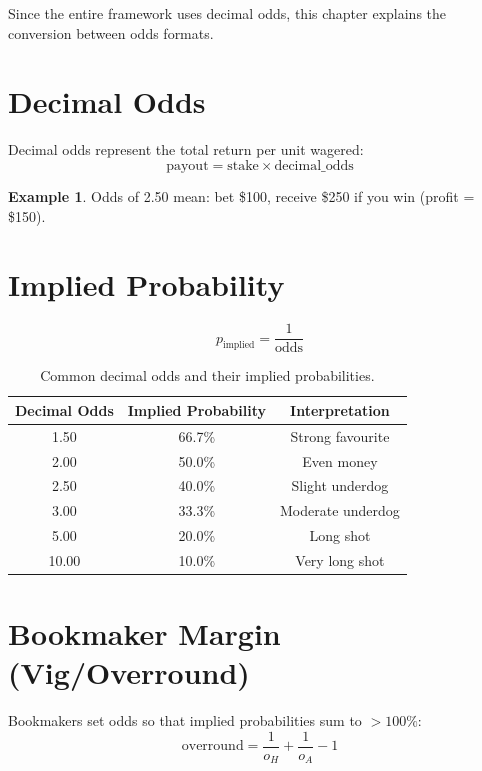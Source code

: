 \documentclass[12pt,a4paper]{report}
\theoremstyle{definition}
\newtheorem{example}{Example}[chapter]
\begin{document}
Since the entire framework uses decimal odds, this chapter explains the conversion between odds formats.

\section{Decimal Odds}

Decimal odds represent the total return per unit wagered:
\begin{equation}
    \text{payout} = \text{stake} \times \text{decimal\_odds}
\end{equation}

\begin{example}
Odds of 2.50 mean: bet \$100, receive \$250 if you win (profit = \$150).
\end{example}

\section{Implied Probability}

\begin{equation}
    p_{\text{implied}} = \frac{1}{\text{odds}}
    \label{eq:implied-prob}
\end{equation}

\begin{table}[H]
\centering
\caption{Common decimal odds and their implied probabilities.}
\label{tab:odds-implied}
\begin{tabular}{ccc}
\toprule
\textbf{Decimal Odds} & \textbf{Implied Probability} & \textbf{Interpretation} \\
\midrule
1.50 & 66.7\% & Strong favourite \\
2.00 & 50.0\% & Even money \\
2.50 & 40.0\% & Slight underdog \\
3.00 & 33.3\% & Moderate underdog \\
5.00 & 20.0\% & Long shot \\
10.00 & 10.0\% & Very long shot \\
\bottomrule
\end{tabular}
\end{table}

\section{Bookmaker Margin (Vig/Overround)}

Bookmakers set odds so that implied probabilities sum to $> 100\%$:
\begin{equation}
    \text{overround} = \frac{1}{o_H} + \frac{1}{o_A} - 1
\end{equation}
\end{document}
